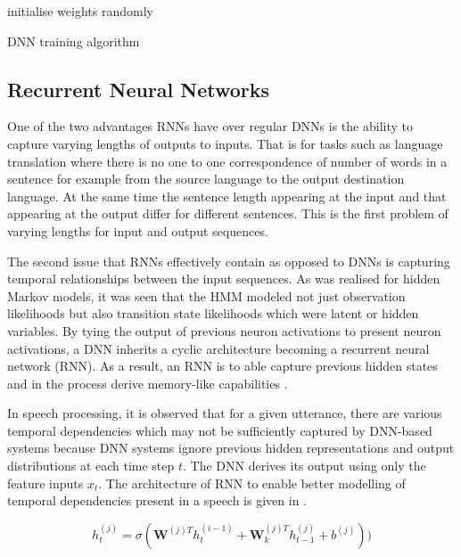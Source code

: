 \begin{algorithm}[H]
\SetAlgoLined
{}
 initialise weights randomly\;
 \caption{DNN training algorithm}
\end{algorithm}

\subsection{Recurrent Neural Networks}
One of the two advantages RNNs have over regular DNNs is the ability to capture varying lengths of outputs to inputs.  That is for tasks such as language translation where there is no one to one correspondence of number of words in a sentence for example from the source language to the output destination language.  At the same time the sentence length appearing at the input and that appearing at the output differ for different sentences.  This is the first problem of varying lengths for input and output sequences.

The second issue that RNNs effectively contain as opposed to DNNs is capturing temporal relationships between the input sequences.  As was realised for hidden Markov models, it was seen that the HMM modeled not just observation likelihoods but also transition state likelihoods which were latent or hidden variables.  By tying the output of previous neuron activations to present neuron activations, a DNN inherits a cyclic architecture becoming a recurrent neural network (RNN). As a result, an RNN is to able capture previous hidden states and in the process derive memory-like capabilities \citep{yu2016automatic}.

In speech processing, it is observed that for a given utterance, there are various temporal dependencies which may not be sufficiently captured by DNN-based systems because DNN systems ignore previous hidden representations and output distributions at each time step $t$.  The DNN derives its output using only the  feature inputs $x_t$. The architecture of RNN to enable better modelling of temporal dependencies present in a speech is given in \citep{hannun2014first, yu2016automatic}. 

\begin{equation}h_t^{(j)}=\sigma(\mathbf{W}^{(j)T}h_t^{(i-1)}+\mathbf{W}^{(j)T}_kh_{t-1}^{(j)}+b^{(j)}))
\label{eqn_c3_rnn01}\end{equation}

